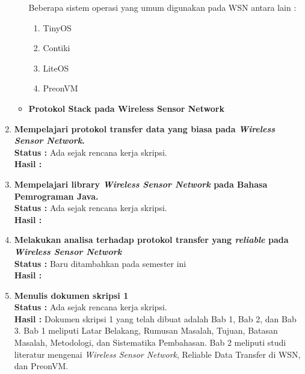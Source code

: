 \documentclass[a4paper,twoside]{article}
\begin{document}
\begin{enumerate}
\begin{itemize}
Beberapa sistem operasi yang umum digunakan pada WSN antara lain :
\begin{enumerate}
	\item TinyOS
	\item Contiki
	\item LiteOS
	\item PreonVM
\end{enumerate}
		\end{itemize}
		
		\begin{itemize}
		\item \textbf{Protokol Stack pada Wireless Sensor Network}
		\end{itemize}

		\item \textbf{Mempelajari protokol transfer data yang biasa pada \textit{Wireless Sensor Network}.}\\
		{\bf Status :} Ada sejak rencana kerja skripsi.\\
		{\bf Hasil :}

		\item \textbf{Mempelajari library \textit{Wireless Sensor Network} pada Bahasa Pemrograman Java.}\\
		{\bf Status :} Ada sejak rencana kerja skripsi.\\
		{\bf Hasil :}
		
		\item \textbf{Melakukan analisa terhadap protokol transfer yang \textit{reliable} pada \textit{Wireless Sensor Network}}\\
		{\bf Status :} Baru ditambahkan pada semester ini \\
		{\bf Hasil :} 
		
		\item \textbf{Menulis dokumen skripsi 1}\\
		{\bf Status :} Ada sejak rencana kerja skripsi.\\
		{\bf Hasil :} Dokumen skripsi 1 yang telah dibuat adalah Bab 1, Bab 2, dan Bab 3. Bab 1 meliputi Latar Belakang, Rumusan Masalah, Tujuan, Batasan Masalah, Metodologi, dan Sistematika Pembahasan. Bab 2 meliputi studi literatur mengenai \textit{Wireless Sensor Network}, Reliable Data Transfer di WSN, dan PreonVM.

	\end{enumerate}
\end{document}
